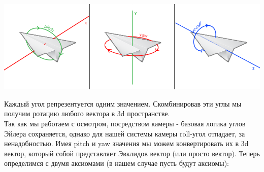 \documentclass[12pt]{article}
\begin{document}
    \includegraphics[width=\linewidth]{images/camera_pitch_yaw_roll.png}

    \noindent
    Каждый угол репрезентуется одним значением. Скомбинировав эти углы 
    мы получим ротацию любого вектора в 3d пространстве.\\[0.5cm]
    \noindent
    Так как мы работаем с осмотром, посредством камеры - базовая логика углов Эйлера
    сохраняется, однако для нашей системы камеры roll-угол отпадает, за ненадобностью.
    Имея pitch и yaw значения мы можем конвертировать их в 3d вектор, который собой представляет
    Эвклидов вектор (или просто вектор). 
    Теперь определимся с двумя аксиомами (в нашем случае пусть будут аксиомы):
\end{document}
